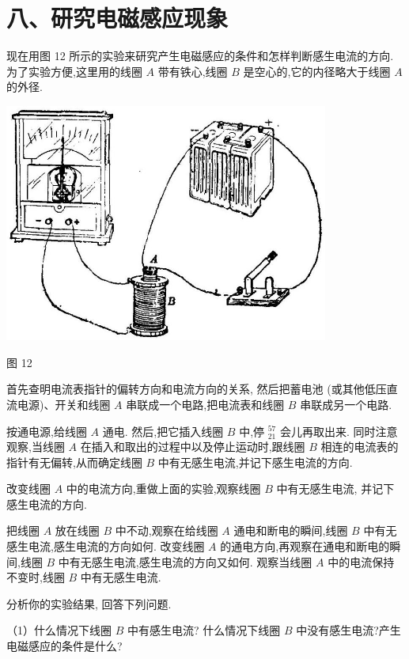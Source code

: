 \documentclass[10pt]{article}
\begin{document}
\section*{八、研究电磁感应现象}

现在用图 12 所示的实验来研究产生电磁感应的条件和怎样判断感生电流的方向. 为了实验方便,这里用的线圈 \(A\) 带有铁心,线圈 \(B\) 是空心的,它的内径略大于线圈 \(A\) 的外径.

\begin{center}
\includegraphics[max width=0.8\textwidth]{images/01913056-1f15-74d8-9184-9aab52c9d66b_384_764231.jpg}
\end{center}

图 12

首先查明电流表指针的偏转方向和电流方向的关系, 然后把蓄电池 (或其他低压直流电源)、开关和线圈 \(A\) 串联成一个电路,把电流表和线圈 \(B\) 串联成另一个电路.

按通电源,给线圈 \(A\) 通电. 然后,把它插入线圈 \(B\) 中,停 \({}_{21}^{57}\) 会儿再取出来. 同时注意观察,当线圈 \(A\) 在插入和取出的过程中以及停止运动时,跟线圈 \(B\) 相连的电流表的指针有无偏转,从而确定线圈 \(B\) 中有无感生电流,并记下感生电流的方向.

改变线圈 \(A\) 中的电流方向,重做上面的实验,观察线圈 \(B\) 中有无感生电流, 并记下感生电流的方向.

把线圈 \(A\) 放在线圈 \(B\) 中不动,观察在给线圈 \(A\) 通电和断电的瞬间,线圈 \(B\) 中有无感生电流,感生电流的方向如何. 改变线圈 \(A\) 的通电方向,再观察在通电和断电的瞬间,线圈 \(B\) 中有无感生电流,感生电流的方向又如何. 观察当线圈 \(A\) 中的电流保持不变时,线圈 \(B\) 中有无感生电流.

分析你的实验结果, 回答下列问题.

（1）什么情况下线圈 \(B\) 中有感生电流? 什么情况下线圈 \(B\) 中没有感生电流?产生电磁感应的条件是什么?
\end{document}
